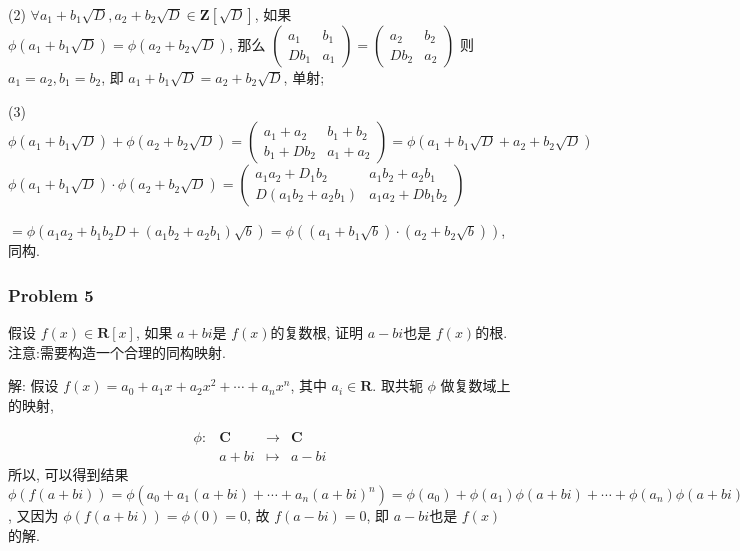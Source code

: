 \documentclass[a4paper,12pt]{ctexart}
\newcommand{\Z}{\mathbf{Z}}
\newcommand{\Com}{\mathbf{C}}
\newcommand{\R}{\mathbf{R}}
\begin{document}
\begin{enumerate}
        (2) $\forall a_{1}+b_{1} \sqrt{D}, a_{2}+b_{2} \sqrt{D} \in\Z[\sqrt{D}] $, 如果 $ \phi\left(a_{1}+b_{1} \sqrt{D}\right)=\phi\left(a_{2}+b_{2} \sqrt{D}\right)$,
         那么 $\left(\begin{array}{ll}a_{1} & b_{1} \\ D b_{1} & a_{1}\end{array}\right)=\left(\begin{array}{ll}a_{2} & b_{2} \\ D b_{2} & a_{2}\end{array}\right)$ 则 $a_{1}=a_{2}, b_{1}=b_{2}$, 即 $a_{1}+b_{1} \sqrt{D}=a_{2}+b_{2} \sqrt{D}$, 单射;

        (3) $\phi\left(a_{1}+b_{1} \sqrt{D}\right)+\phi\left(a_{2}+b_{2} \sqrt{D}\right)=\left(\begin{array}{ll}a_{1}+a_{2} & b_{1}+b_{2} \\ b_{1}+D b_{2} & a_{1}+a_{2}\end{array}\right)=\phi\left(a_{1}+b_{1} \sqrt{D}+a_{2}+b_{2} \sqrt{D}\right)$
        $\phi\left(a_{1}+b_{1} \sqrt{D}\right) \cdot \phi\left(a_{2}+b_{2} \sqrt{D}\right)=\left(\begin{array}{ll}a_{1} a_{2}+D_{1} b_{2} & a_{1} b_{2}+a_{2} b_{1} \\ D\left(a_{1} b_{2}+a_{2} b_{1}\right) & a_{1} a_{2}+D b_{1} b_{2}\end{array}\right)$

        $=\phi\left(a_{1} a_{2}+b_{1} b_{2} D+\left(a_{1} b_{2}+a_{2} b_{1}\right) \sqrt{b}\right)=\phi\left(\left(a_{1}+b_{1} \sqrt{b}\right)\cdot\left(a_{2}+b_{2} \sqrt{b}\right)\right)$, 同构.
    \end{enumerate}
\subsubsection*{Problem 5}
    假设 $ f(x)\in\R[x] $, 如果 $ a+bi $是 $ f(x) $的复数根, 证明 $ a-bi $也是 $ f(x) $的根.
    注意:需要构造一个合理的同构映射. 
    
    解: 假设 $ f(x)=a_0+a_1x+a_2x^2+\cdots+a_nx^n $, 其中 $ a_i\in\R $. 取共轭 $ \phi $ 做复数域上的映射, 

    \[\begin{array}{cccc}
      \phi:& \Com& \rightarrow& \Com\\
      &a+bi&\mapsto&a-bi
    \end{array}\]
    所以, 可以得到结果 $ \phi(f(a+bi))=\phi(a_0+a_1(a+bi)+\cdots+a_n(a+bi)^n)=\phi(a_0)+\phi(a_1)\phi(a+bi)+\cdots+\phi(a_n)\phi(a+bi)^n=a_0+a_1(a-bi)+\cdots+a_n(a-bi)^n=f(a-bi) $, 又因为 $ \phi(f(a+bi))=\phi(0)=0 $, 故 $ f(a-bi)=0 $, 即 $ a-bi $也是 $ f(x) $的解.
\end{document}
